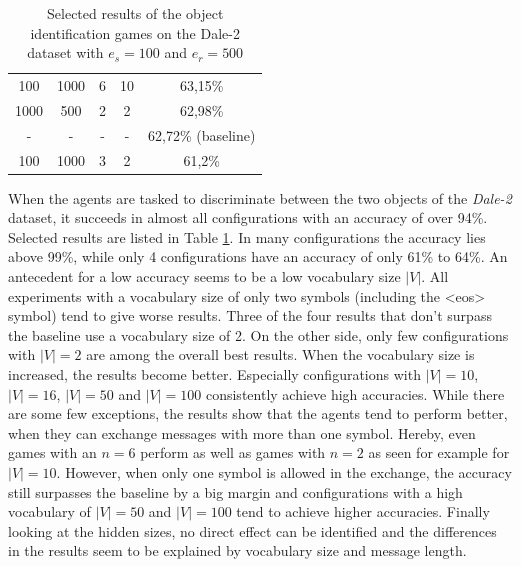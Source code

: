 \begin{table}[ht]
\begin{tabular}{cccc|c}
        {100}  & {1000} & {6} & {10}  & {63,15\%}                           \\
        {1000} & {500}  & {2} & {2}   & {62,98\%}                           \\\midrule
        {-}    & {-}    & {-} & {-}   & {62,72\% (baseline)}                \\\midrule
        {100}  & {1000} & {3} & {2}   & {61,2\%}                            \\
        \bottomrule
    \end{tabular}
    \caption{Selected results of the object identification games on the Dale-2 dataset with $e_s=100$ and $e_r=500$}
    \label{tab:results_discriminator_dale-2}
\end{table}

When the agents are tasked to discriminate between the two objects of the \emph{Dale-2} dataset, it succeeds in almost all configurations with an accuracy of over 94\%.
Selected results are listed in Table \ref{tab:results_discriminator_dale-2}.
In many configurations the accuracy lies above 99\%, while only 4 configurations have an accuracy of only 61\% to 64\%.
An antecedent for a low accuracy seems to be a low vocabulary size $|V|$.
All experiments with a vocabulary size of only two symbols (including the <eos> symbol) tend to give worse results.
Three of the four results that don't surpass the baseline use a vocabulary size of 2.
On the other side, only few configurations with $|V| = 2$ are among the overall best results.
When the vocabulary size is increased, the results become better.
Especially configurations with $|V| = 10$, $|V| = 16$, $|V| = 50$ and $|V| = 100$ consistently achieve high accuracies.
While there are some few exceptions, the results show that the agents tend to perform better, when they can exchange messages with more than one symbol.
Hereby, even games with an $n = 6$ perform as well as games with $n = 2$ as seen for example for $|V| = 10$.
However, when only one symbol is allowed in the exchange, the accuracy still surpasses the baseline by a big margin and configurations with a high vocabulary of $|V| = 50$ and $|V| = 100$ tend to achieve higher accuracies.
Finally looking at the hidden sizes, no direct effect can be identified and the differences in the results seem to be explained by vocabulary size and message length.

